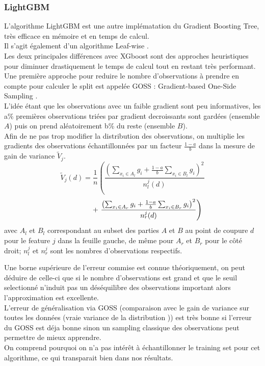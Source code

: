 \documentclass[french]{article}
\begin{document}
\begin{multicols}{2}
\subsubsection{LightGBM}
L'algorithme LightGBM est une autre implématation du Gradient Boosting Tree, très efficace en mémoire et en temps de calcul.\\
Il s'agit également d'un algorithme \og Leaf-wise \fg{}.\\
Les deux principales différences avec XGboost sont des approches heuristiques pour diminuer drastiquement le temps de calcul tout en restant très performant.\\
Une première approche pour reduire le nombre d'observations à prendre en compte pour calculer le split est appelée GOSS : \og Gradient-based One-Side Sampling \fg{}.\\
L'idée étant que les observations avec un faible gradient sont peu informatives, les a\% premières observations triées par gradient decroissants sont gardées (ensemble $A$) puis on prend aléatoirement b\% du reste (ensemble $B$).\\
Afin de ne pas trop modifier la distribution des observations, on multiplie les gradients des observations échantillonnées par un facteur $\frac{1-a}{b}$ dans la mesure de gain de variance $\tilde{V}_{j}$.\\
\[
\tilde{V}_{j}(d)=\frac{1}{n}\left(\frac{\left(\sum_{x_{i} \in A_{l}} g_{i}+\frac{1-a}{b} \sum_{x_{i} \in B_{l}} g_{i}\right)^{2}}{n_{l}^{j}(d)} \right. \]
\[ \null \qquad \qquad + \left. \frac{\left(\sum_{x_{i} \in A_{r}} g_{i}+\frac{1-a}{b} \sum_{x_{i} \in B_{r}} g_{i}\right)^{2}}{n_{r}^{j}(d)}\right)
\]
avec $A_l$ et $B_l$ correspondant au subset des parties $A$ et $B$ au point de coupure $d$ pour le feature $j$ dans la feuille gauche, de même pour $A_r$ et $B_r$ pour le côté droit; $n_l^j$ et $n_r^j$ sont les nombres d'observations respectifs.

Une borne supérieure de l'erreur commise est connue théoriquement, on peut déduire de celle-ci que si le nombre d'observations est grand et que le seuil selectionné n'induit pas un déséquilibre des observations important alors l'approximation est excellente.\\
L'erreur de généralisation via GOSS (comparaison avec le gain de variance sur toutes les données (\og vraie variance de la distribution \fg{})) est très bonne si l'erreur du GOSS est déja bonne sinon un sampling classique des observations peut permettre de mieux apprendre.\\
On comprend pourquoi on n'a pas intérêt à échantillonner le training set pour cet algorithme, ce qui transparait bien dans nos résultats.


\end{multicols}
\end{document}
